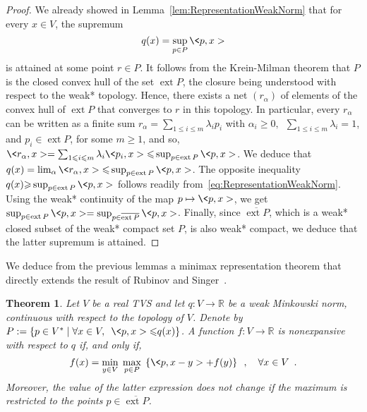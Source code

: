 \documentclass[a4paper,11pt]{amsart}
\newtheorem{theorem}{Theorem}[section]
\theoremstyle{definition}
\theoremstyle{remark}
\begin{document}
\begin{proof}
  We already showed in Lemma~\ref{lem:RepresentationWeakNorm} that for every $x \in V$, the supremum
  \[ q(x) = \sup_{p\in {P}} \<p,x> \]
  is attained at some point $r \in P$.
  It follows from the Krein-Milman theorem that $P$ is the closed convex hull of the set $\operatorname{ext}{P}$, the closure being understood with respect to the weak* topology.
  Hence, there exists a net $(r_\alpha)$ of elements of the convex hull of $\operatorname{ext}{P}$ that converges to $r$ in this topology.
  In particular, every $r_\alpha$ can be written as a finite sum $r_\alpha = \sum_{1 {\leqslant} i {\leqslant} m} \lambda_i p_i$ with $\alpha_i {\geqslant} 0, \enspace \sum_{1 {\leqslant} i {\leqslant} m} \lambda_i = 1$, and $p_i \in \operatorname{ext}{P}$, for some $m {\geqslant} 1$, and so, $\<r_\alpha,x> = \sum_{1 {\leqslant} i {\leqslant} m} \lambda_i \<p_i,x> {\leqslant} \sup_{p \in \operatorname{ext}{P}} \<p,x>$. 
  We deduce that $q(x) = \lim_\alpha \<r_\alpha,x> {\leqslant} \sup_{p \in \operatorname{ext}{P}} \<p,x>$.
  The opposite inequality $q(x) {\geqslant} \sup_{p \in \operatorname{ext}{P}} \<p,x>$ follows readily from~\eqref{eq:RepresentationWeakNorm}.
  Using  the weak* continuity of the map $p \mapsto \<p,x>$, we get $\sup_{p \in \operatorname{ext}{P}} \<p,x>= \sup_{p\in{\overline{{\operatorname{ext}{P}}}}}\<p,x>$.
  Finally, since ${\overline{{\operatorname{ext}{P}}}}$, which is a weak* closed subset of the weak* compact set $P$, is also weak* compact, we deduce that the latter supremum is attained.
\end{proof}

We deduce from the previous lemmas a minimax representation theorem that directly extends the result of Rubinov and Singer~\cite[Theorem 5.3]{RS01b}.
\begin{theorem}
  \label{thm:RepresentationN}
  Let $V$ be a real TVS and let $q:V \to {\mathbb{R}}$ be a weak Minkowski norm, continuous with respect to the topology of $V$.
  Denote by $P := \{ p \in V^* \mid \forall x \in V, \enspace \<p,x> {\leqslant} q(x) \}$.
  A function $f:V \to {\mathbb{R}}$ is nonexpansive with respect to $q$ if, and only if,
  \begin{equation}
    \label{eq:RepresentationN}
    f(x) = \min_{y \in V} \; \max_{p \in P} \; \left\{ \<p,x-y> + f(y) \right\} \enspace , \quad \forall x \in V \enspace .
  \end{equation}
  Moreover, the value of the latter expression does not change if the maximum is restricted to the points $p \in {\overline{{\operatorname{ext}{P}}}}$.
\end{theorem}
\end{document}

